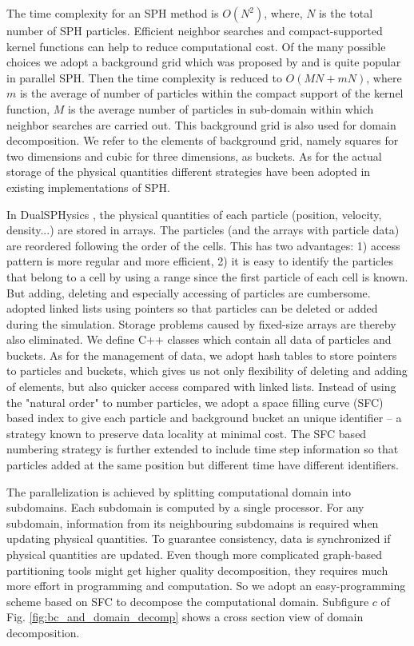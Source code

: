 \documentclass[gmd, manuscript]{copernicus}
\begin{document}
The time complexity for an SPH method is $O(N^2)$, where, $N$ is the total number of SPH particles. Efficient neighbor searches and compact-supported kernel functions can help to reduce computational cost. Of the many possible choices we adopt a background grid  which was proposed by \citet {monaghan1985refined} and is quite popular in parallel SPH. Then the time complexity is reduced to $O(MN+mN)$, where $m$ is the average of number of particles within the compact support of the kernel function, $M$ is the average number of particles in sub-domain within which neighbor searches are carried out. This background grid is also used for domain decomposition. We refer to the elements of background grid, namely squares for two dimensions and cubic for three dimensions, as buckets. 
As for the actual storage of the physical quantities  different strategies have been adopted in existing implementations of SPH.

In DualSPHysics \citep {crespo2015dualsphysics}, the physical quantities of each particle (position, velocity, density...) are stored in arrays. The particles (and the arrays with particle data) are reordered following the order of the cells. This has two advantages: 1) access pattern is more regular and more efficient, 2) it is easy to identify the particles that belong to a cell by using a range since the first particle of each cell is known. But adding, deleting and especially accessing of particles are cumbersome. \citet {ferrari2009new} adopted linked lists using pointers so that particles can be deleted or added during the simulation. Storage problems caused by fixed-size arrays are thereby also eliminated. We define C++ classes which contain all data of particles and buckets. As for the management of data, we adopt hash tables to store pointers to particles and buckets, which gives us not only flexibility of deleting and adding of elements, but also quicker access compared with linked lists. Instead of using the "natural order" to number particles, we adopt a space filling curve (SFC) based index to give each particle and background bucket an unique identifier -- a strategy known to preserve data locality at minimal cost. The SFC based numbering strategy is further extended to include time step information so that particles added at the same position but different time have different identifiers. 

The parallelization is achieved by splitting computational domain into subdomains. Each subdomain is computed by a single processor. For any subdomain, information from its neighbouring subdomains is required when updating physical quantities. To guarantee consistency, data is synchronized if physical quantities are updated. Even though more complicated graph-based partitioning tools \citep {biswas1999experiments} might get higher quality decomposition, they requires much more effort in programming and computation. So we adopt an easy-programming scheme based on SFC \citep {patra1999efficient} to decompose the computational domain. Subfigure $c$ of Fig. \ref{fig:bc_and_domain_decomp} shows a cross section view of domain decomposition.
\end{document}
